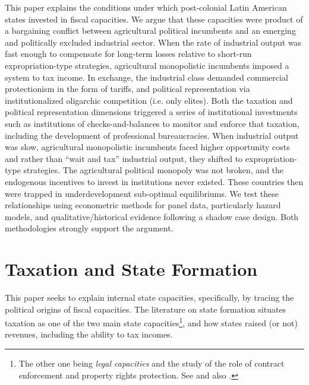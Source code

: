 \documentclass[onesided]{article}\usepackage[]{graphicx}\usepackage[]{color}
\begin{document}
This paper explains the conditions under which post-colonial Latin American states invested in fiscal capacities. We argue that these capacities were product of a bargaining conflict between agricultural political incumbents and an emerging and politically excluded industrial sector. When the rate of industrial output was fast enough to compensate for long-term  losses relative to short-run expropriation-type strategies, agricultural monopolistic incumbents imposed a system to tax income. In exchange, the industrial class demanded commercial protectionism in the form of tariffs, and political representation via institutionalized oligarchic competition (i.e. only elites). Both the taxation and political representation dimensions triggered a series of institutional investments such as institutions of checks-and-balances to monitor and enforce that taxation, including the development of professional bureaucracies. When industrial output was slow, agricultural monopolistic incumbents faced higher opportunity costs and rather than ``wait and tax'' industrial output, they shifted to expropriation-type strategies. The agricultural political monopoly was not broken, and the endogenous incentives to invest in institutions never existed. These countries then were trapped in underdevelopment sub-optimal equilibriums. We test these relationships using econometric methods for panel data, particularly hazard models, and qualitative/historical evidence following a shadow case design. Both methodologies strongly support the argument.

\section{Taxation and State Formation}

This paper seeks to explain internal state capacities, specifically, by tracing the political origins of fiscal capacities. The literature on state formation situates taxation as one of the two main state capacities\footnote{
	The other one being \emph{legal capacities} and the study of the role of contract enforcement and  property rights protection. See \citet{Cardenas2010} and also \citet{Besley2010}.
	}, and how states raised (or not) revenues, including the ability to tax incomes.
\end{document}
